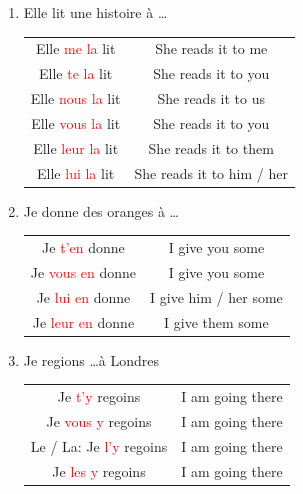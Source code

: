\documentclass{book}
\begin{document}
    \begin{enumerate}
        \item Elle lit une histoire à \dots 
            \begin{tabular}{|c|c|}
                \hline
                Elle \textcolor{red}{me la} lit & She reads it to me \\
                Elle \textcolor{red}{te la} lit & She reads it to you \\
                Elle \textcolor{red}{nous la} lit & She reads it to us \\
                Elle \textcolor{red}{vous la} lit & She reads it to you \\
                Elle \textcolor{red}{leur la} lit & She reads it to them \\
                Elle \textcolor{red}{lui la} lit & She reads it to him / her \\
                \hline
            \end{tabular}

        \item Je donne des oranges à \dots 
            \begin{tabular}{|c|c|}
                \hline
                Je \textcolor{red}{t'en} donne & I give you some \\
                Je \textcolor{red}{vous en} donne & I give you some \\
                Je \textcolor{red}{lui en} donne & I give him / her some \\
                Je \textcolor{red}{leur en} donne & I give them some \\
            \end{tabular}
        
        \item Je regions \dots à Londres 
            \begin{tabular}{|c|c|}
                \hline
                Je \textcolor{red}{t'y} regoins & I am going there \\
                Je \textcolor{red}{vous y} regoins & I am going there \\
                Le / La: Je \textcolor{red}{l'y} regoins & I am going there \\
                Je \textcolor{red}{les y} regoins & I am going there \\
                \hline
            \end{tabular}
    \end{enumerate}
\end{document}
